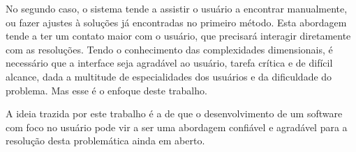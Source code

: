 No segundo caso, o sistema tende a assistir o usuário a encontrar manualmente, ou fazer ajustes à soluções já encontradas no primeiro método. Esta abordagem tende a ter um contato maior com o usuário, que precisará interagir diretamente com as resoluções. Tendo o conhecimento das complexidades dimensionais, é necessário que a interface seja agradável ao usuário, tarefa crítica e de difícil alcance, dada a multitude de especialidades dos usuários e da dificuldade do problema. Mas esse é o enfoque deste trabalho.

A ideia trazida por este trabalho é a de que o desenvolvimento de um software com foco no usuário pode vir a ser uma abordagem confiável e agradável para a resolução desta problemática ainda em aberto.